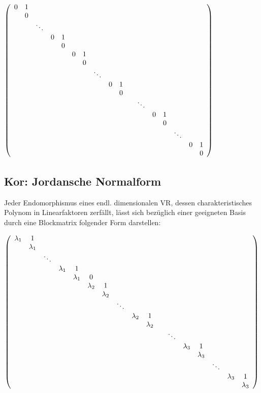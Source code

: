 \documentclass[titlepage,12pt,a4paper,ngerman]{report}
\begin{document}
\begin{center}
	\mbox{\scriptsize $\left (\begin{array}{*{20}c}
		0 & 1\\
		& 0 \\
		& & \ddots\\
		& & & 0 & 1\\
		& & & & 0\\
		& & & & & 0 & 1\\
		& & & & & & 0 \\
		& & & & & & & \ddots\\
		& & & & & & & & 0 & 1\\
		& & & & & & & & & 0\\
		& & & & & & & & & & & \ddots \\
		& & & & & & & & & & & & 0 & 1\\ 
		& & & & & & & & & & & & & 0 \\ 
		& & & & & & & & & & & & & & \ddots\\ 
		& & & & & & & & & & & & & & & 0 & 1\\ 
		& & & & & & & & & & & & & & & & 0\\
		\end{array} \right)$}
\end{center}

\subsection{Kor: Jordansche Normalform}
Jeder Endomorphismus eines endl. dimensionalen VR, dessen charakteristisches Polynom in Linearfaktoren zerfällt, lässt sich bezüglich einer geeigneten Basis durch eine Blockmatrix folgender Form darstellen:

\begin{center}
	\mbox{\scriptsize $\left (\begin{array}{*{20}c}
		\lambda_1 & 1\\
		& \lambda_1 \\
		& & \ddots\\
		& & & \lambda_1 & 1\\
		& & & & \lambda_1 & 0\\
		& & & & & \lambda_2 & 1\\
		& & & & & & \lambda_2 \\
		& & & & & & & \ddots\\
		& & & & & & & & \lambda_2 & 1\\
		& & & & & & & & & \lambda_2\\
		& & & & & & & & & & & \ddots \\
		& & & & & & & & & & & & \lambda_3 & 1\\ 
		& & & & & & & & & & & & & \lambda_3 \\ 
		& & & & & & & & & & & & & & \ddots\\ 
		& & & & & & & & & & & & & & & \lambda_3 & 1\\ 
		& & & & & & & & & & & & & & & & \lambda_3\\
		\end{array} \right)$}
\end{center}
\end{document}
